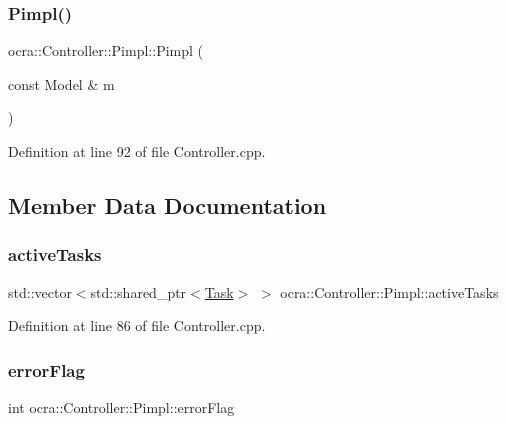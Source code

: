 \subsubsection{\texorpdfstring{Pimpl()}{Pimpl()}}
{\footnotesize\ttfamily ocra\+::\+Controller\+::\+Pimpl\+::\+Pimpl (\begin{DoxyParamCaption}\item[{const Model \&}]{m }\end{DoxyParamCaption})\hspace{0.3cm}{\ttfamily [inline]}}



Definition at line 92 of file Controller.\+cpp.



\subsection{Member Data Documentation}
\hypertarget{structocra_1_1Controller_1_1Pimpl_a721a40c7b21e230a7508995ecfa93d60}{}\label{structocra_1_1Controller_1_1Pimpl_a721a40c7b21e230a7508995ecfa93d60} 
\subsubsection{\texorpdfstring{active\+Tasks}{activeTasks}}
{\footnotesize\ttfamily std\+::vector$<$std\+::shared\+\_\+ptr$<$\hyperlink{classocra_1_1Task}{Task}$>$ $>$ ocra\+::\+Controller\+::\+Pimpl\+::active\+Tasks}



Definition at line 86 of file Controller.\+cpp.

\hypertarget{structocra_1_1Controller_1_1Pimpl_a8a4ac972687499a277fa08dced73180c}{}\label{structocra_1_1Controller_1_1Pimpl_a8a4ac972687499a277fa08dced73180c} 
\subsubsection{\texorpdfstring{error\+Flag}{errorFlag}}
{\footnotesize\ttfamily int ocra\+::\+Controller\+::\+Pimpl\+::error\+Flag}



